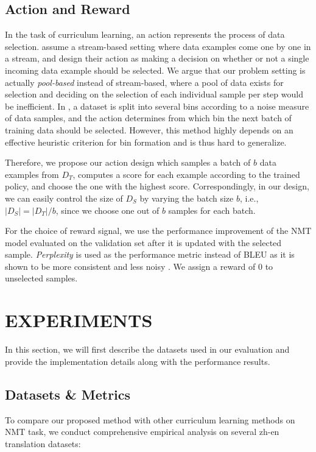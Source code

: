 \documentclass[letterpaper]{article}
\begin{document}
\subsection{Action and Reward}
\label{subsec:actionReward}

In the task of curriculum learning, an action represents the process of data selection. \cite{fang2017learning} assume a stream-based setting where data examples come one by one in a stream, and design their action as making a decision on whether or not a single incoming data example should be selected. We argue that our problem setting is actually \emph{pool-based} instead of stream-based, where a pool of data exists for selection and deciding on the selection of each individual sample per step would be inefficient. In \cite{kumar2019reinforcement}, a dataset is split into several bins according to a noise measure of data samples, and the action determines from which bin the next batch of training data should be selected. However, this method highly depends on an effective heuristic criterion for bin formation and is thus hard to generalize.

Therefore, we propose our action design which samples a batch of $b$ data examples from $D_T$, computes a score for each example according to the trained policy, and choose the one with the highest score. Correspondingly, in our design, we can easily control the size of $D_S$ by varying the batch size $b$, i.e., $|D_S| = |D_T|/b$, since we choose one out of $b$ samples for each batch.

For the choice of reward signal, we use the performance improvement of the NMT model evaluated on the validation set after it is updated with the selected sample. \emph{Perplexity} is used as the performance metric instead of BLEU as it is shown to be more consistent and less noisy \cite{so2019evolved}. We assign a reward of $0$ to unselected samples.

\section{EXPERIMENTS}
\label{sec:simu}

In this section, we will first describe the datasets used in our evaluation and provide the implementation details along with the performance results.

\subsection{Datasets \& Metrics}
To compare our proposed method with other curriculum learning methods on NMT task, we conduct comprehensive empirical analysis on several zh-en translation datasets:
\end{document}
